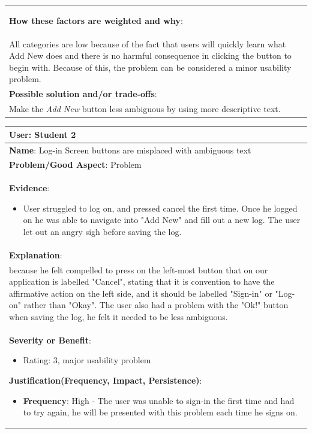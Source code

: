 \documentclass[pdftex,12pt,a4paper]{report}
\begin{document}
\begin{center}
\begin{tabular}{|p{\textwidth}|}
\begin{itemize}
	\end{itemize}
	\textbf{How these factors are weighted and why}:\\
	All categories are low because of the fact that users will quickly learn what Add New does and there is no harmful consequence in clicking the button to begin with. Because of this, the problem can be considered a minor usability problem.\\
	\hline
	\textbf{Possible solution and/or trade-offs}:\\
	Make the \emph{Add New} button less ambiguous by using more descriptive text.\\
	\hline
	\end{tabular}
\end{center}

\begin{center}
	\begin{tabular}{|p{\textwidth}|}
	\hline
	\textbf{User}: Student 2\\
	\hline
	\textbf{Name}: Log-in Screen buttons are misplaced with ambiguous text\\
	\hline
	\textbf{Problem/Good Aspect}: Problem\\
	\hline
	\textbf{Evidence}:
	\begin{itemize}
	\item{User struggled to log on, and pressed cancel the first time. Once he logged on he was able to navigate into "Add New" and fill out a new log. The user let out an angry sigh before saving the log.}
	\end{itemize}\\
	\hline
	\textbf{Explanation}:\\
	because he felt compelled to press on the left-most button that on our application is labelled "Cancel", stating that it is convention to have the affirmative action on the left side, and it should be labelled "Sign-in" or "Log-on" rather than "Okay". The user also had a problem with the "Ok!" button when saving the log, he felt it needed to be less ambiguous.\\
	\hline
	\textbf{Severity or Benefit}:
	\begin{itemize}
	\item{Rating: 3, major usability problem}
	\end{itemize}
	\textbf{Justification(Frequency, Impact, Persistence)}:
	\begin{itemize}
	\item{\textbf{Frequency}:} High - The user was unable to sign-in the first time and had to try again, he will be presented with this problem each time he signs on.

\end{itemize}
\end{tabular}
\end{center}
\end{document}
